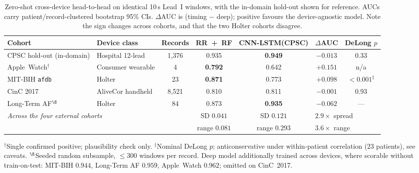 \begin{table}[t]
\centering
\caption{Zero-shot cross-device head-to-head on identical 10\,s Lead~I windows,
with the in-domain hold-out shown for reference. AUCs carry patient/record-clustered
bootstrap 95\% CIs. $\Delta$AUC is (timing $-$ deep); positive favours the
device-agnostic model. Note the sign changes across cohorts, and that the two
Holter cohorts disagree.}
\label{tab:crossdevice}
\small
\begin{tabular}{llccccc}
\toprule
Cohort & Device class & Records & RR~+~RF & CNN-LSTM(CPSC) & $\Delta$AUC & DeLong $p$ \\
\midrule
CPSC hold-out (in-domain) & Hospital 12-lead & 1{,}376 & 0.935 & \textbf{0.949} & $-0.013$ & 0.33 \\
\midrule
Apple~Watch$^{\dagger}$ & Consumer wearable & 4 & \textbf{0.792} & 0.642 & $+0.151$ & n/a \\
MIT-BIH \texttt{afdb} & Holter & 23 & \textbf{0.871} & 0.773 & $+0.098$ & $<0.001^{\ddagger}$ \\
CinC 2017 & AliveCor handheld & 8{,}521 & 0.810 & 0.811 & $-0.001$ & 0.93 \\
Long-Term AF$^{\S}$ & Holter & 84 & 0.873 & \textbf{0.935} & $-0.062$ & --- \\
\midrule
\multicolumn{3}{l}{\emph{Across the four external cohorts}}
 & SD $0.041$ & SD $0.121$ & \multicolumn{2}{l}{$2.9\times$ spread} \\
\multicolumn{3}{l}{}
 & range $0.081$ & range $0.293$ & \multicolumn{2}{l}{$3.6\times$ range} \\
\bottomrule
\end{tabular}

\vspace{2pt}
{\footnotesize $^{\dagger}$Single confirmed positive; plausibility check only.
$^{\ddagger}$Nominal DeLong $p$; anticonservative under within-patient correlation
($23$ patients), see caveats. $^{\S}$Seeded random subsample, $\le300$ windows per
record. Deep model additionally trained across devices, where scorable without
train-on-test: MIT-BIH $0.944$, Long-Term AF $0.959$, Apple~Watch $0.962$;
omitted on CinC~2017.}
\end{table}

